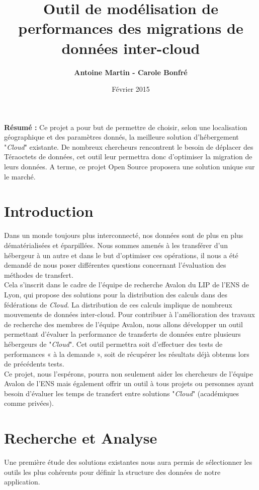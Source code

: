 \documentclass[10pt]{article}
\title{\Huge{Outil de modélisation de performances des migrations de données inter-cloud}}
\author{\textbf{Antoine Martin - Carole Bonfré} }
\date{Février 2015}
\begin{document}
\maketitle

\textbf{Résumé : } Ce projet a pour but de permettre de choisir, selon une localisation géographique et des paramètres donnés, la meilleure solution d'hébergement "\textit{Cloud}" existante. De nombreux chercheurs rencontrent le besoin de déplacer des Téraoctets de données, cet outil leur permettra donc d'optimiser la migration de leurs données. A terme, ce projet Open Source proposera une solution unique sur le marché.

\section{Introduction}

Dans un monde toujours plus interconnecté, nos données sont de plus en plus dématérialisées et éparpillées. Nous sommes amenés à les transférer d’un hébergeur à un autre et dans le but d’optimiser ces opérations, il nous a été demandé de nous poser différentes questions concernant l’évaluation des méthodes de transfert.\\

Cela s’inscrit dans le cadre de l’équipe de recherche Avalon du LIP de l’ENS de Lyon, qui propose des solutions pour la distribution des calculs dans des fédérations de \textit{Cloud}. La distribution de ces calculs implique de nombreux mouvements de données inter-cloud. Pour contribuer à l’amélioration des travaux de recherche des membres de l’équipe Avalon, nous allons développer un outil permettant d’évaluer la performance de transferts de données entre plusieurs hébergeurs de "\textit{Cloud}". Cet outil permettra soit d’effectuer des tests de performances « à la demande », soit de récupérer les résultats déjà obtenus lors de précédents tests.\\

Ce projet, nous l’espérons, pourra non seulement aider les chercheurs de l’équipe Avalon de l’ENS mais également offrir un outil à tous projets ou personnes ayant besoin d’évaluer les temps de transfert entre solutions "\textit{Cloud}" (académiques comme privées).

\section{Recherche et Analyse}
Une première étude des solutions existantes nous aura permis de sélectionner les outils les plus cohérents pour définir la structure des données de notre application.
\end{document}
